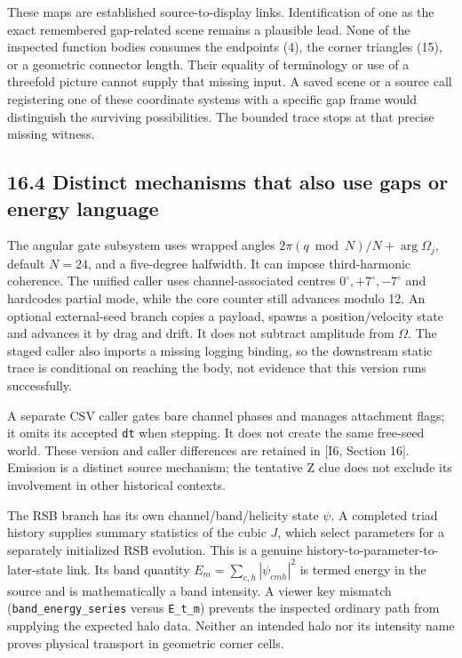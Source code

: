 \documentclass[
  11pt,
  a4paper,
]{article}
\begin{document}
These maps are established source-to-display links. Identification of one as the exact remembered gap-related scene remains a plausible lead. None of the inspected function bodies consumes the endpoints (4), the corner triangles (15), or a geometric connector length. Their equality of terminology or use of a threefold picture cannot supply that missing input. A saved scene or a source call registering one of these coordinate systems with a specific gap frame would distinguish the surviving possibilities. The bounded trace stops at that precise missing witness.

\subsection{16.4 Distinct mechanisms that also use gaps or energy language}\label{distinct-mechanisms-that-also-use-gaps-or-energy-language}

The angular gate subsystem uses wrapped angles \(2\pi(q\bmod N)/N+\arg\Omega_j\), default \(N=24\), and a five-degree halfwidth. It can impose third-harmonic coherence. The unified caller uses channel-associated centres \(0^\circ,+7^\circ,-7^\circ\) and hardcodes partial mode, while the core counter still advances modulo 12. An optional external-seed branch copies a payload, spawns a position/velocity state and advances it by drag and drift. It does not subtract amplitude from \(\Omega\). The staged caller also imports a missing logging binding, so the downstream static trace is conditional on reaching the body, not evidence that this version runs successfully.

A separate CSV caller gates bare channel phases and manages attachment flags; it omits its accepted \texttt{dt} when stepping. It does not create the same free-seed world. These version and caller differences are retained in {[}I6, Section 16{]}. Emission is a distinct source mechanism; the tentative Z clue does not exclude its involvement in other historical contexts.

The RSB branch has its own channel/band/helicity state \(\psi\). A completed triad history supplies summary statistics of the cubic \(J\), which select parameters for a separately initialized RSB evolution. This is a genuine history-to-parameter-to-later-state link. Its band quantity \(E_m=\sum_{c,h}|\psi_{cmh}|^2\) is termed energy in the source and is mathematically a band intensity. A viewer key mismatch (\texttt{band\_energy\_series} versus \texttt{E\_t\_m}) prevents the inspected ordinary path from supplying the expected halo data. Neither an intended halo nor its intensity name proves physical transport in geometric corner cells.
\end{document}
